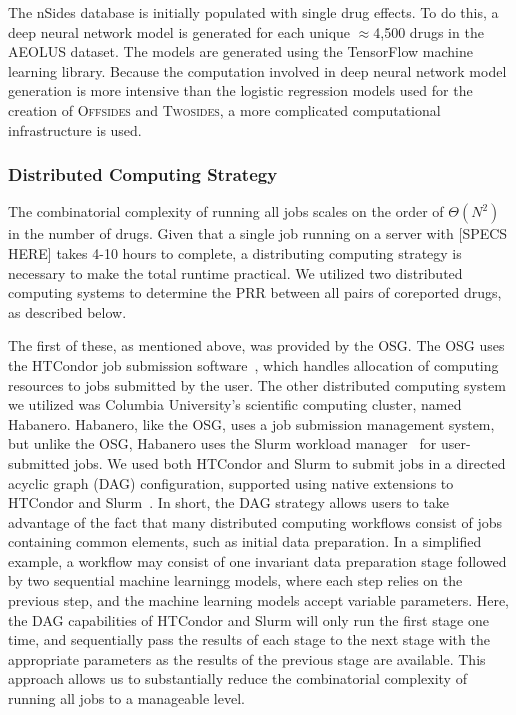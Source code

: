 \documentclass{ws-procs11x85}
\begin{document}
The nSides database is initially populated with single drug
effects. To do this, a deep neural network model is generated for each
unique $\approx$4,500 drugs in the AEOLUS dataset. The models are
generated using the TensorFlow machine learning library. Because the
computation involved in deep neural network model generation is more
intensive than the logistic regression models used for the creation of
O\textsc{ffsides} and T\textsc{wosides}, a more complicated
computational infrastructure is used.

\subsubsection{Distributed Computing Strategy}
The combinatorial complexity of running all jobs scales on the order of $\Theta(N^2)$ in the number of drugs. Given that a single job running on a server with [SPECS HERE] takes 4-10 hours to complete, a distributing computing strategy is necessary to make the total runtime practical. We utilized two distributed computing systems to determine the PRR between all pairs of coreported drugs, as described below.

The first of these, as mentioned above, was provided by the OSG. The OSG uses the HTCondor job submission software~\cite{beowulfbook-condor}, which handles allocation of computing resources to jobs submitted by the user. The other distributed computing system we utilized was Columbia University's scientific computing cluster, named Habanero. Habanero, like the OSG, uses a job submission management system, but unlike the OSG, Habanero uses the Slurm workload manager~\cite{slurm} for user-submitted jobs. We used both HTCondor and Slurm to submit jobs in a directed acyclic graph (DAG) configuration, supported using native extensions to HTCondor and Slurm~\cite{dagman}. In short, the DAG strategy allows users to take advantage of the fact that many distributed computing workflows consist of jobs containing common elements, such as initial data preparation. In a simplified example, a workflow may consist of one invariant data preparation stage followed by two sequential machine learningg models, where each step relies on the previous step, and the machine learning models accept variable parameters. Here, the DAG capabilities of HTCondor and Slurm will only run the first stage one time, and sequentially pass the results of each stage to the next stage with the appropriate parameters as the results of the previous stage are available. This approach allows us to substantially reduce the combinatorial complexity of running all jobs to a manageable level.
\end{document}
